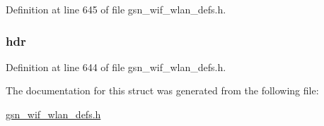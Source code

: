 Definition at line 645 of file gsn\_\-wif\_\-wlan\_\-defs.h.

\hypertarget{a00309_a8b74d10ee4154e2bb6bf61685c529910}{
\subsubsection[{hdr}]{ {\bf hdr}}}
\label{a00309_a8b74d10ee4154e2bb6bf61685c529910}


Definition at line 644 of file gsn\_\-wif\_\-wlan\_\-defs.h.



The documentation for this struct was generated from the following file:\begin{DoxyCompactItemize}
\item 
\hyperlink{a00613}{gsn\_\-wif\_\-wlan\_\-defs.h}\end{DoxyCompactItemize}
